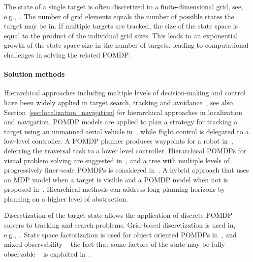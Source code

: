\documentclass[journal]{IEEEtran}
\begin{document}
The state of a single target is often discretized to a finite-dimensional grid, see, e.g.,~\cite{foka2003predictive,miller2009pomdp,capitan2013decentralized,satsangi2018exploiting}.
The number of grid elements equals the number of possible states the target may be in.
{If multiple targets are tracked}, the size of the state space is equal to the product of the individual grid sizes.
This leads to an exponential growth of the state space size in the number of targets, leading to computational challenges in solving the related POMDP.
%




%

%
%
%

%


%
%
%

%


\paragraph{Solution methods}
Hierarchical approaches including multiple levels of decision-making and control have been widely applied in target search, tracking and avoidance~\cite{foka2003predictive,sridharan2010planning,capitan2013decentralized,zhang2013active,vanegas2016uav,goldhoorn2018searching,yi2019indoor}, see also Section~\ref{sec:localization_navigation} for hierarchical approaches in localization and navigation.
POMDP models are applied to plan a strategy for tracking a target using an unmanned aerial vehicle in~\cite{vanegas2016uav}, while flight control is delegated to a low-level controller.
A POMDP planner produces waypoints for a robot in~\cite{capitan2013decentralized,goldhoorn2018searching}, deferring the traversal task to a lower level controller.
Hierarchical POMDPs for visual problem solving are suggested in~\cite{sridharan2010planning,zhang2013active}, and a tree with multiple levels of progressively finer-scale POMDPs is considered in~\cite{foka2003predictive}.
A hybrid approach that uses an MDP model when a target is visible and a POMDP model when not is proposed in~\cite{yi2019indoor}.
{Hiearchical methods can address long planning horizons by planning on a higher level of abstraction.}

Discretization of the target state allows the application of discrete POMDP solvers to tracking and search problems.
Grid-based discretization is used in, e.g.,~\cite{foka2003predictive,miller2009pomdp,capitan2013decentralized,satsangi2018exploiting}.
State space factorization is used for object oriented POMDPs in~{\cite{wandzel2019multi,zheng2021}}, and mixed observability -- the fact that some factors of the state may be fully observable -- is exploited in~\cite{ong2010planning,gupta2017decision}.
\end{document}
